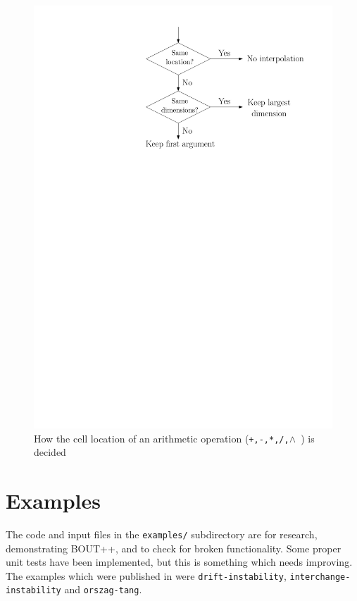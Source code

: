 \documentclass[12pt]{article}
\newcommand{\code}[1]{\texttt{#1}}
\newcommand{\pow}{\ensuremath{\wedge} }
\begin{document}
\begin{figure}[htbp!]
\centering
\includegraphics[width=0.4\paperwidth, keepaspectratio]{figs/stagArith.pdf}
\caption{How the cell location of an arithmetic operation (\code{+,-,*,/,\pow}) is decided}
\label{fig:stagArith}
\end{figure}


\section{Examples}
\label{sec:examples}

The code and input files in the \texttt{examples/} subdirectory are for research, demonstrating BOUT++, 
and to check for broken functionality. Some proper unit tests have been implemented, but this
is something which needs improving. The examples which were published in \cite{Dudson2009,dudson-2008-arxiv}
were \texttt{drift-instability}, \texttt{interchange-instability} and \texttt{orszag-tang}.
\end{document}
